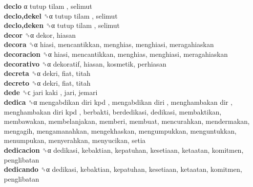 \textbf{declo} α   tutup tilam , selimut  \\
\textbf{declo,dekel} ␝α   tutup tilam , selimut  \\
\textbf{declo,deken} ␝α   tutup tilam , selimut  \\
\textbf{decor} ␝α  dekor, hiasan  \\
\textbf{decora} ␝α  hiasi, mencantikkan, menghias, menghiasi, meragahiaskan  \\
\textbf{decoracion} ␝α  hiasi, mencantikkan, menghias, menghiasi, meragahiaskan  \\
\textbf{decorativo} ␝α  dekoratif, hiasan, kosmetik, perhiasan  \\
\textbf{decreta} ␝α  dekri, fiat, titah  \\
\textbf{decreto} ␝α  dekri, fiat, titah  \\
\textbf{dede} ␝ϲ   jari kaki , jari, jemari  \\
\textbf{dedica} ␝α   mengabdikan diri kpd ,  mengabdikan diri ,  menghambakan dir ,  menghambakan diri kpd , berbakti, berdedikasi, dedikasi, membaktikan, membawakan, membelanjakan, memberi, membuat, mencurahkan, mendermakan, mengagih, mengamanahkan, mengekhaskan, mengumpukkan, menguntukkan, menumpukan, menyerahkan, menyucikan, setia  \\
\textbf{dedicacion} ␝α  dedikasi, kebaktian, kepatuhan, kesetiaan, ketaatan, komitmen, penglibatan  \\
\textbf{dedicando} ␝α  dedikasi, kebaktian, kepatuhan, kesetiaan, ketaatan, komitmen, penglibatan  \\
